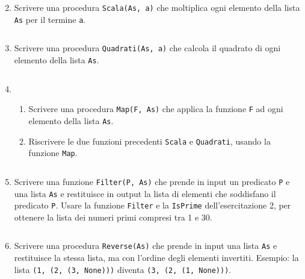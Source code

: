 \documentclass[11pt,a4]{article}
\newcommand{\mybox}[2]{$\quad$\fbox{
\begin{minipage}{#1cm}
\hfill\vspace{#2cm}
\end{minipage}
}}
\begin{document}
\begin{enumerate}
\mybox{15}{2.0}

\item Scrivere una procedura {\tt Scala(As, a)} che moltiplica ogni elemento della lista {\tt As} per il termine {\tt a}.

\mybox{15}{1.5}

\item Scrivere una procedura {\tt Quadrati(As, a)} che calcola il quadrato di ogni elemento della lista {\tt As}.

\mybox{15}{1.5}

\item 
\begin{enumerate}
\item Scrivere una procedura {\tt Map(F, As)} che applica la funzione {\tt F} ad ogni elemento della lista {\tt As}.
\item Riscrivere le due funzioni precedenti {\tt Scala} e {\tt Quadrati}, usando la funzione {\tt Map}.
\end{enumerate}

\mybox{15}{2.0}

\item Scrivere una funzione {\tt Filter(P, As)} che prende in input un predicato {\tt P} e una lista {\tt As}
e restituisce in output la lista di elementi che soddisfano il predicato {\tt P}. Usare la funzione {\tt Filter}
e la {\tt IsPrime} dell'esercitazione 2, per ottenere la lista dei numeri primi compresi tra 1 e 30.


\mybox{15}{2.5}

\item Scrivere una procedura {\tt Reverse(As)} che prende in input una lista {\tt As} e restituisce la stessa lista, ma con l'ordine degli elementi invertiti. 
Esempio: la lista {\tt (1, (2, (3, None)))} diventa {\tt (3, (2, (1, None)))}.

\mybox{15}{2.5}
\end{enumerate}
\end{document}
